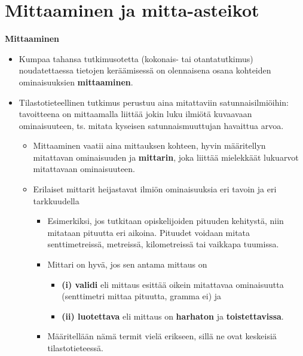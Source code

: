 \documentclass[
]{book}
\providecommand{\tightlist}{%
  \setlength{\itemsep}{0pt}\setlength{\parskip}{0pt}}
\begin{document}
\hypertarget{alaluku53}{%
\section{Mittaaminen ja mitta-asteikot}\label{alaluku53}}

\textbf{Mittaaminen}

\begin{itemize}
\tightlist
\item
  Kumpaa tahansa tutkimusotetta (kokonais- tai otantatutkimus) noudatettaessa tietojen keräämisessä on olennaisena osana kohteiden ominaisuuksien \textbf{mittaaminen}.
\item
  Tilastotieteellinen tutkimus perustuu aina mitattaviin satunnaisilmiöihin: tavoitteena on mittaamalla liittää jokin luku ilmiötä kuvaavaan ominaisuuteen, ts. mitata kyseisen satunnaismuuttujan havaittua arvoa.

  \begin{itemize}
  \tightlist
  \item
    Mittaaminen vaatii aina mittauksen kohteen, hyvin määritellyn mitattavan ominaisuuden ja \textbf{mittarin}, joka liittää mielekkäät lukuarvot mitattavaan ominaisuuteen.
  \item
    Erilaiset mittarit heijastavat ilmiön ominaisuuksia eri tavoin ja eri tarkkuudella

    \begin{itemize}
    \tightlist
    \item
      Esimerkiksi, jos tutkitaan opiskelijoiden pituuden kehitystä, niin mitataan pituutta eri aikoina. Pituudet voidaan mitata senttimetreissä, metreissä, kilometreissä tai vaikkapa tuumissa.
    \item
      Mittari on hyvä, jos sen antama mittaus on

      \begin{itemize}
      \tightlist
      \item
        \textbf{(i) validi} eli mittaus esittää oikein mitattavaa ominaisuutta (senttimetri mittaa pituutta, gramma ei) ja
      \item
        \textbf{(ii) luotettava} eli mittaus on \textbf{harhaton} ja \textbf{toistettavissa}.
      \end{itemize}
    \item
      Määritellään nämä termit vielä erikseen, sillä ne ovat keskeisiä tilastotieteessä.
    \end{itemize}
  \end{itemize}
\end{itemize}
\end{document}
